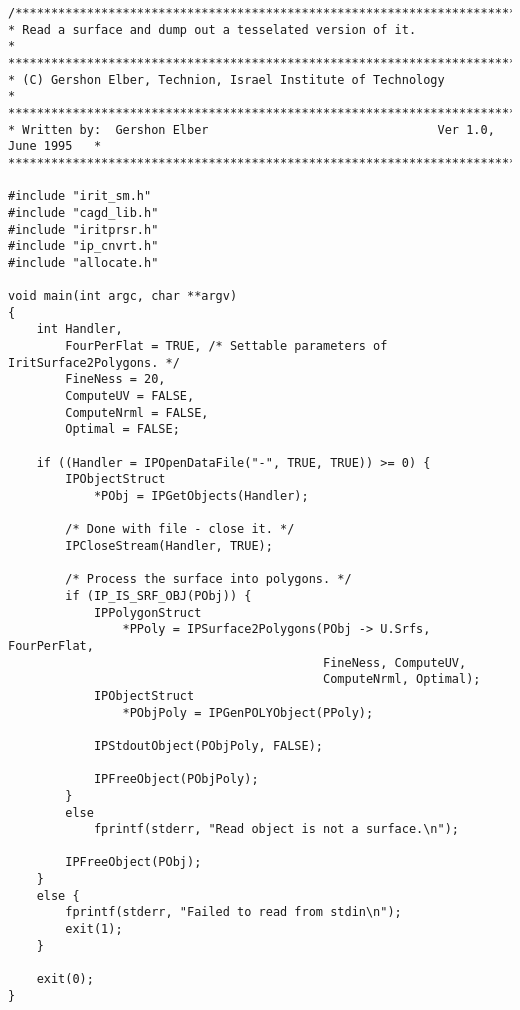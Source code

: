 \begin{verbatim}
/*****************************************************************************
* Read a surface and dump out a tesselated version of it.                     *
******************************************************************************
* (C) Gershon Elber, Technion, Israel Institute of Technology                *
******************************************************************************
* Written by:  Gershon Elber                                Ver 1.0, June 1995   *
*****************************************************************************/

#include "irit_sm.h"
#include "cagd_lib.h"
#include "iritprsr.h"
#include "ip_cnvrt.h"
#include "allocate.h"

void main(int argc, char **argv)
{
    int Handler,
        FourPerFlat = TRUE, /* Settable parameters of IritSurface2Polygons. */
        FineNess = 20,
        ComputeUV = FALSE,
        ComputeNrml = FALSE,
        Optimal = FALSE;

    if ((Handler = IPOpenDataFile("-", TRUE, TRUE)) >= 0) {
        IPObjectStruct
            *PObj = IPGetObjects(Handler);

        /* Done with file - close it. */
        IPCloseStream(Handler, TRUE);

        /* Process the surface into polygons. */
        if (IP_IS_SRF_OBJ(PObj)) {
            IPPolygonStruct
                *PPoly = IPSurface2Polygons(PObj -> U.Srfs, FourPerFlat,
                                            FineNess, ComputeUV,
                                            ComputeNrml, Optimal);
            IPObjectStruct
                *PObjPoly = IPGenPOLYObject(PPoly);

            IPStdoutObject(PObjPoly, FALSE);

            IPFreeObject(PObjPoly);
        }
        else
            fprintf(stderr, "Read object is not a surface.\n");

        IPFreeObject(PObj);
    }
    else {
        fprintf(stderr, "Failed to read from stdin\n");
        exit(1);
    }

    exit(0);
}
\end{verbatim}
